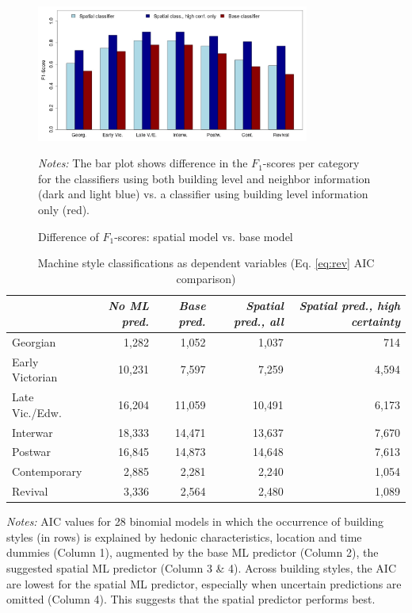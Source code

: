 \documentclass[]{article}
\begin{document}
\newpage

\begin{figure}[htb!]
  \caption{Difference of $F_1$-scores: spatial model vs. base model }
  \centering
    \includegraphics[width=0.8\textwidth]{figures/barplot_f1scores.jpg}
  \label{fig:boxplot}
\begin{minipage}{0.7\textwidth}
\vspace{0.25cm}
\footnotesize \emph{Notes:} The bar plot shows difference in the $F_1$-scores per category for the classifiers using both building level and neighbor information (dark and light blue) vs. a classifier using building level information only (red).
\end{minipage}
\end{figure}

\newpage

\begin{table}[htb!]
\caption{Machine style classifications as dependent variables (Eq. \ref{eq:rev} AIC comparison) }
\label{tab:aic}
\centering
\begin{tabular}{lrrrr}
  \toprule
 & \emph{No ML pred.} & \emph{Base pred.} & \emph{Spatial pred., all} & \emph{Spatial pred., high certainty} \\ 
  \midrule
  Georgian & 1,282 & 1,052 & 1,037 & 714 \\ 
  Early Victorian & 10,231 & 7,597 & 7,259 & 4,594 \\ 
  Late Vic./Edw. & 16,204 & 11,059 & 10,491 & 6,173 \\ 
  Interwar & 18,333 & 14,471 & 13,637 & 7,670 \\ 
  Postwar & 16,845 & 14,873 & 14,648 & 7,613 \\ 
  Contemporary & 2,885 & 2,281 & 2,240 & 1,054 \\ 
  Revival & 3,336 & 2,564 & 2,480 & 1,089 \\ 
   \bottomrule
\end{tabular}
\begin{minipage}{0.7\textwidth}
\vspace{0.25cm}
\footnotesize \emph{Notes:}
AIC values for 28 binomial models in which the occurrence of building styles (in rows) is explained by hedonic characteristics, location and time dummies (Column 1), augmented by the base ML predictor (Column 2), the suggested spatial ML predictor (Column 3 \& 4). Across building styles, the AIC are lowest for the spatial ML predictor, especially when uncertain predictions are omitted (Column 4). This suggests that the spatial predictor performs best.
\end{minipage}
\end{table}
\end{document}
